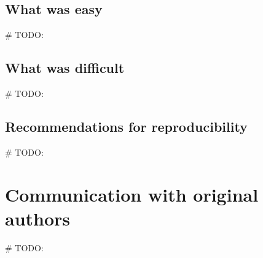 \documentclass[11pt,a4paper,fleqn]{article}
\begin{document}
\subsection{What was easy}
\# TODO:


\subsection{What was difficult}
\# TODO:


\subsection{Recommendations for reproducibility}
\# TODO:

\section{Communication with original authors}
\# TODO:





\end{document}
